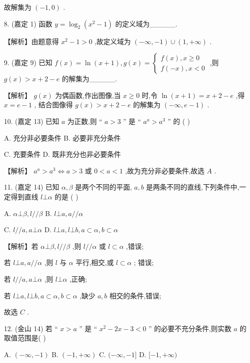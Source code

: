 \documentclass[10pt]{article}
\begin{document}
故解集为 \(\left( {-1,0}\right)\) .

8. (嘉定 1) 函数 \(y = {\log }_{2}\left( {{x}^{2} - 1}\right)\) 的定义域为\_\_\_\_\_.

【解析】由题意得 \({x}^{2} - 1 > 0\) ,故定义域为 \(\left( {-\infty , - 1}\right)  \cup  \left( {1, + \infty }\right)\) .

9. (嘉定 9) 已知 \(f\left( x\right)  = \ln \left( {x + 1}\right) ,g\left( x\right)  = \left\{  \begin{array}{l} f\left( x\right) ,x \geq  0 \\  f\left( {-x}\right) ,x < 0 \end{array}\right.\) ,则 \(g\left( x\right)  > x + 2 - e\) 的解集为\_\_\_\_\_.

【解析】 \(g\left( x\right)\) 为偶函数,作出图像,当 \(x \geq  0\) 时,令 \(\ln \left( {x + 1}\right)  = x + 2 - e\) ,得 \(x = e - 1\) , 结合图像得 \(g\left( x\right)  > x + 2 - e\) 的解集为 \(\left( {-\infty ,e - 1}\right)\) .

10. (嘉定 13) 已知 \(a\) 为正数,则 “ \(a > 3\) ” 是 “ \({a}^{a} > {a}^{3}\) ” 的 ( )

A. 充分非必要条件 B. 必要非充分条件

C. 充要条件 D. 既非充分也非必要条件

【解析】 \({a}^{a} > {a}^{3} \Leftrightarrow  a > 3\) 或 \(0 < a < 1\) ,故为充分非必要条件,故选 \(A\) .

11. (嘉定 14) 已知 \(\alpha ,\beta\) 是两个不同的平面, \(a,b\) 是两条不同的直线,下列条件中,一定得到直线 \(l \bot  \alpha\) 的是 ( )

A. \(\alpha  \bot  \beta ,l//\beta\) B. \(l \bot  a,a//\alpha\)

C. \(l//a,a \bot  \alpha\) D. \(l \bot  a,l \bot  b,a \subset  \alpha ,b \subset  \alpha\)

【解析】若 \(\alpha  \bot  \beta ,l//\beta\) ,则 \(l//\alpha\) 或 \(l \subset  \alpha\) ,错误;

若 \(l \bot  a,a//\alpha\) ,则 \(l\) 与 \(\alpha\) 平行,相交,或 \(l \subset  \alpha\) ; 错误;

若 \(l//a,a \bot  \alpha\) ,则 \(l \bot  \alpha\) ,正确;

若 \(l \bot  a,l \bot  b,a \subset  \alpha ,b \subset  \alpha\) ,缺少 \(a,b\) 相交的条件,错误;

故选 \(C\) .

12. (金山 14) 若 “ \(x > a\) ” 是 “ \({x}^{2} - {2x} - 3 < 0\) ” 的必要不充分条件,则实数 \(a\) 的取值范围是( )

A. \(\left( {-\infty , - 1}\right)\) B. \(\left( {-1, + \infty }\right)\) C. \(( - \infty , - 1\rbrack\) D. \(\lbrack  - 1, + \infty )\)
\end{document}
